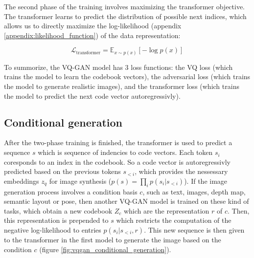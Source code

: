 
The second phase of the training involves maximizing the transformer objective. The transformer learns to predict the distribution of possible next indices, which allows us to directly maximize the log-likelihood (appendix \ref{appendix:likelihood_function}) of the data representation:

\begin{equation}
    \mathcal{L}_{\text{transformer}} = \mathbb{E}_{x \sim p(x)} [- \log p(x)]
\end{equation}

To summorize, the VQ-GAN model has 3 loss functions: the VQ loss (which trains the model to learn the codebook vectors), the adversarial loss (which trains the model to generate realistic images), and the transformer loss (which trains the model to predict the next code vector autoregressivly).







\subsection{Conditional generation}

After the two-phase training is finished, the transformer is used to predict a sequence $s$ which is sequence of indencies to code vectors. Each token $s_i$ coresponds to an index in the codebook. So a code vector is autoregressivly predicted based on the previous tokens $s_{<i}$, which provides the nessessary embeddings $z_q$ for image synthesis ($p(s) = \prod_{i} p(s_i | s_{<i})$). If the image generation process involves a condition basis $c$, such as text, images, depth map, semantic layout or pose, then another VQ-GAN model is trained on these kind of tasks, which obtain a new codebook $Z_c$ which are the representation $r$ of $c$. Then, this representation is prepended to $s$ which restricts the computation of the negative log-likelihood to entries $p(s_i | s_{<i}, r)$. This new sequence is then given to the transformer in the first model to generate the image based on the condition $c$ (figure \ref{fig:vqgan_conditional_generation}).

